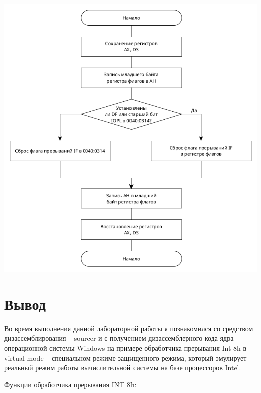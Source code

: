 \documentclass[14pt, a4paper]{article}
\begin{document}
	\begin{minipage}{0.9\linewidth}
		\includegraphics[width=\linewidth]{diagram2}
	\end{minipage}
	
	\pagebreak
	
	\section*{Вывод}
	
	Во время выполнения данной лабораторной работы я познакомился со средством дизассемблирования – sourcer и с получением дизассемблерного кода ядра операционной системы Windows на примере обработчика прерывания Int 8h в virtual mode – специальном режиме защищенного режима, который эмулирует реальный режим работы вычислительной системы на базе процессоров Intel.
	
	Функции обработчика прерывания INT 8h:
	
\end{document}
